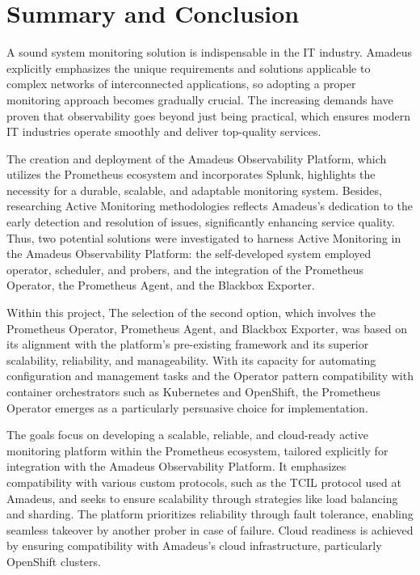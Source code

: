 
\chapter{Summary and Conclusion}\label{chapter:summary_and_conclusion}

A sound system monitoring solution is indispensable in the IT industry. Amadeus explicitly emphasizes the unique requirements and solutions applicable to complex networks of interconnected applications, so adopting a proper monitoring approach becomes gradually crucial. The increasing demands have proven that observability goes beyond just being practical, which ensures modern IT industries operate smoothly and deliver top-quality services. 

The creation and deployment of the Amadeus Observability Platform, which utilizes the Prometheus ecosystem and incorporates Splunk, highlights the necessity for a durable, scalable, and adaptable monitoring system. Besides, researching Active Monitoring methodologies reflects Amadeus's dedication to the early detection and resolution of issues, significantly enhancing service quality. Thus, two potential solutions were investigated to harness Active Monitoring in the Amadeus Observability Platform: the self-developed system employed operator, scheduler, and probers, and the integration of the Prometheus Operator, the Prometheus Agent, and the Blackbox Exporter. 

Within this project, The selection of the second option, which involves the Prometheus Operator, Prometheus Agent, and Blackbox Exporter, was based on its alignment with the platform's pre-existing framework and its superior scalability, reliability, and manageability. With its capacity for automating configuration and management tasks and the Operator pattern compatibility with container orchestrators such as Kubernetes and OpenShift, the Prometheus Operator emerges as a particularly persuasive choice for implementation. 

The goals focus on developing a scalable, reliable, and cloud-ready active monitoring platform within the Prometheus ecosystem, tailored explicitly for integration with the Amadeus Observability Platform. It emphasizes compatibility with various custom protocols, such as the \ac{TCIL} protocol used at Amadeus, and seeks to ensure scalability through strategies like load balancing and sharding. The platform prioritizes reliability through fault tolerance, enabling seamless takeover by another prober in case of failure. Cloud readiness is achieved by ensuring compatibility with Amadeus's cloud infrastructure, particularly OpenShift clusters. 

